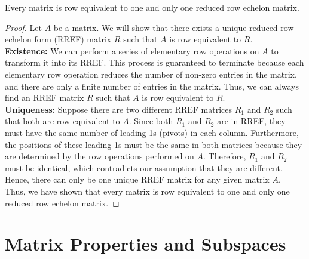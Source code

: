 \documentclass[openany]{book}
\begin{document}
\begin{mytheorem}
Every matrix is row equivalent to one and only one reduced row echelon matrix.
\end{mytheorem}
\begin{proof}
    Let $A$ be a matrix. We will show that there exists a unique reduced row echelon form (RREF) matrix $R$ such that $A$ is row equivalent to $R$. \\
    \textbf{Existence:} We can perform a series of elementary row operations on $A$ to transform it into its RREF. This process is guaranteed to terminate because each elementary row operation reduces the number of non-zero entries in the matrix, and there are only a finite number of entries in the matrix. Thus, we can always find an RREF matrix $R$ such that $A$ is row equivalent to $R$. \\
    \textbf{Uniqueness:} Suppose there are two different RREF matrices $R_1$ and $R_2$ such that both are row equivalent to $A$. Since both $R_1$ and $R_2$ are in RREF, they must have the same number of leading 1s (pivots) in each column. Furthermore, the positions of these leading 1s must be the same in both matrices because they are determined by the row operations performed on $A$. Therefore, $R_1$ and $R_2$ must be identical, which contradicts our assumption that they are different. Hence, there can only be one unique RREF matrix for any given matrix $A$. \\
    Thus, we have shown that every matrix is row equivalent to one and only one reduced row echelon matrix.
\end{proof}
\section{Matrix Properties and Subspaces}
\end{document}
